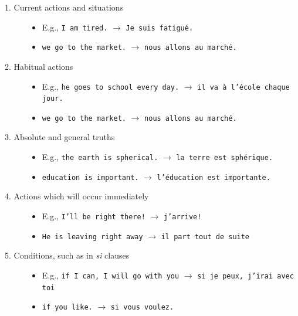 \documentclass[11pt, oneside]{book}
\begin{document}
\begin{description}
	\item[1. Current actions and situations] 

		\begin{itemize}
			\textcolor{white}{a} 
			\item[] E.g., \texttt{I am tired.} $\rightarrow$ \texttt{Je suis fatigu\'e.}
			\item[] \texttt{we go to the market.} $\rightarrow$ \texttt{nous allons au march\'e.}
		\end{itemize}
		
	\item[2. Habitual actions]
	
		\begin{itemize}
			\textcolor{white}{a} 
			\item[] E.g., \texttt{he goes to school every day.} $\rightarrow$ \texttt{il va \`a l'\'ecole chaque jour.}
			\item[] \texttt{we go to the market.} $\rightarrow$ \texttt{nous allons au march\'e.}
		\end{itemize}
	
	
	\item[3. Absolute and general truths]
	
		\begin{itemize}
			\textcolor{white}{a} 
			\item[] E.g., \texttt{the earth is spherical.} $\rightarrow$ \texttt{la terre est sph\'erique.}
			\item[] \texttt{education is important.} $\rightarrow$ \texttt{l'\'education est importante.}
		\end{itemize}
		
	\item[4. Actions which will occur immediately]
	
		\begin{itemize}
			\textcolor{white}{a} 
			\item[] E.g., \texttt{I'll be right there!} $\rightarrow$ \texttt{j'arrive!}
			\item[] \texttt{He is leaving right away} $\rightarrow$ \texttt{il part tout de suite}
		\end{itemize}
		
	\item[5. Conditions, such as in \textit{si} clauses]
	
		\begin{itemize}
			\textcolor{white}{a} 
			\item[] E.g., \texttt{if I can, I will go with you} $\rightarrow$ \texttt{si je peux, j'irai avec toi}
			\item[] \texttt{if you like.} $\rightarrow$ \texttt{si vous voulez.}
		\end{itemize} 
		
\end{description}
\end{document}
